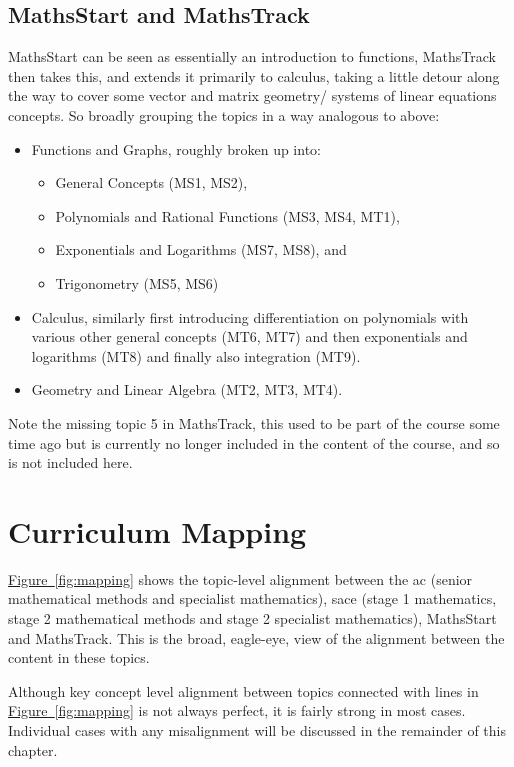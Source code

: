 \documentclass[twoside,12pt,a4paper]{report}
\newcommand{\reffig}[1]{\hyperref[fig:#1]{Figure~\ref{fig:#1}}}
\begin{document}
\subsection{MathsStart and MathsTrack}

MathsStart can be seen as essentially an introduction to functions, MathsTrack then takes this, and extends it primarily to calculus, taking a little detour along the way to cover some vector and matrix geometry/ systems of linear equations concepts. So broadly grouping the topics in a way analogous to above:
\begin{itemize}
	\item Functions and Graphs, roughly broken up into:
		\begin{itemize}
			\item General Concepts (MS1, MS2),
			\item Polynomials and Rational Functions (MS3, MS4, MT1),
			\item Exponentials and Logarithms (MS7, MS8), and 
			\item Trigonometry (MS5, MS6)
		\end{itemize}
	\item Calculus, similarly first introducing differentiation on polynomials with various other general concepts (MT6, MT7) and then exponentials and logarithms (MT8) and finally also integration (MT9).
	\item Geometry and Linear Algebra (MT2, MT3, MT4).
\end{itemize}

Note the missing topic 5 in MathsTrack, this used to be part of the course some time ago but is currently no longer included in the content of the course, and so is not included here.








\section{Curriculum Mapping}
\label{sec:mapping}

\reffig{mapping} shows the topic-level alignment between the \gls{ac} (senior mathematical methods and specialist mathematics), \gls{sace} (stage 1 mathematics, stage 2 mathematical methods and stage 2 specialist mathematics), MathsStart and MathsTrack. This is the broad, eagle-eye, view of the alignment between the content in these topics.

Although key concept level alignment between topics connected with lines in \reffig{mapping} is not always perfect, it is fairly strong in most cases. Individual cases with any misalignment will be discussed in the remainder of this chapter.
\end{document}
